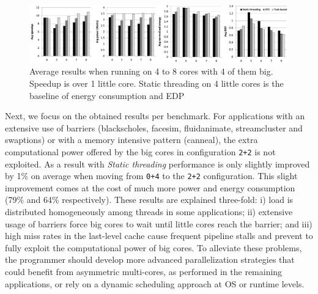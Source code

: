 \begin{figure}[t]%
	\centering
	\includegraphics[width=\textwidth]{figures/averages_4plus.pdf}
	\vspace{-0.5cm}
	\caption{Average results when running on 4 to  8 cores with 4 of them big. Speedup is over 1 little core. Static threading on 4 little cores is the baseline of energy consumption and EDP}
	\label{fig:averages4plus}%
	\vspace{-0.3cm}
\end{figure}


Next, we focus on the obtained results per benchmark. For applications with an extensive use of barriers (blackscholes, facesim, fluidanimate, streamcluster and swaptions) or with a memory intensive pattern (canneal), the extra computational power offered by the big cores in configuration \texttt{2+2} is not exploited. As a result with \emph{Static threading} performance is only slightly improved by 1\% on average when moving from \texttt{0+4} to the \texttt{2+2} configuration. This slight improvement comes at the cost of much more power and energy consumption (79\% and 64\% respectively).
These results are explained three-fold: i) load is distributed homogeneously among threads in some 
applications; ii) extensive usage of barriers force big cores to wait until little cores reach the 
barrier; and iii) high miss rates in the last-level cache cause frequent pipeline stalls and prevent 
to fully exploit the computational power of big cores. To alleviate these problems, the programmer 
should develop more advanced parallelization strategies that could benefit from asymmetric 
multi-cores, as performed in the remaining applications, or rely on a dynamic scheduling approach 
at OS or runtime levels.

